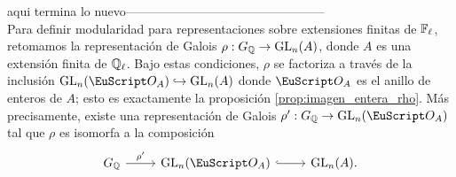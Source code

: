 \documentclass[../../tesis_maestria]{subfiles}
\begin{document}
aqui termina lo nuevo------------------------------------------------\\



Para definir modularidad para representaciones sobre extensiones finitas de $\mathbb{F}_{\ell}$, retomamos la representaci\'on de Galois $\rho:G_{\mathbb{Q}}\rightarrow\mathrm{GL}_n(A)$, donde $A$ es una extensi\'on finita de $\mathbb{Q}_{\ell}$. Bajo estas condiciones, $\rho$ se factoriza a trav\'es de la inclusi\'on $\GL_n(\Oo_{A})\hookrightarrow\GL_n(A)$ donde $\Oo_A$ es el anillo de enteros de $A$; esto es exactamente la proposici\'on \ref{prop:imagen_entera_rho}. M\'as precisamente, existe una representaci\'on de
Galois $\rho':\GQ\ra\GL_n(\Oo_A)$ tal que $\rho$ es isomorfa a la composici\'on
\[
  \begin{tikzcd}
    \GQ \arrow[r,"\rho'"] & \GL_n(\Oo_A) \arrow[r,hook] & \GL_n(A).
  \end{tikzcd}
\]
\end{document}
